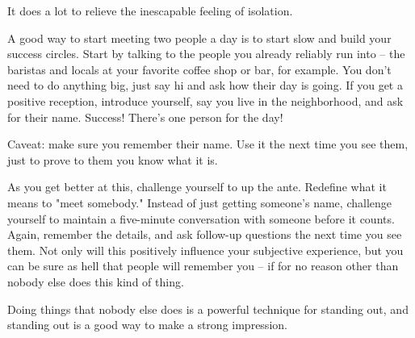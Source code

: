 \documentclass[../the-millions-of-gestures.tex]{subfiles}
\begin{document}
It does a lot to relieve the inescapable feeling of isolation.

A good way to start meeting two people a day is to start slow and build your
success circles. Start by talking to the people you already reliably run into --
the baristas and locals at your favorite coffee shop or bar, for example. You
don't need to do anything big, just say hi and ask how their day is going. If
you get a positive reception, introduce yourself, say you live in the
neighborhood, and ask for their name. Success! There's one person for the day!

Caveat: make sure you remember their name. Use it the next time you see them,
just to prove to them you know what it is.

As you get better at this, challenge yourself to up the ante. Redefine what it
means to "meet somebody." Instead of just getting someone's name, challenge
yourself to maintain a five-minute conversation with someone before it counts.
Again, remember the details, and ask follow-up questions the next time you see
them. Not only will this positively influence your subjective experience, but
you can be sure as hell that people will remember you -- if for no reason other
than nobody else does this kind of thing.

Doing things that nobody else does is a powerful technique for standing out, and
standing out is a good way to make a strong impression.
\end{document}
